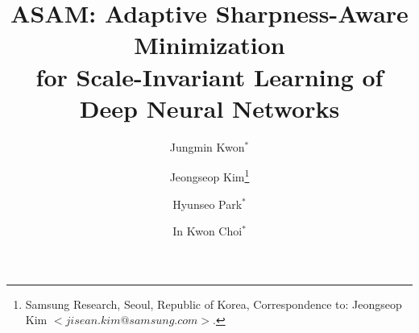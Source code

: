 \documentclass{article}
\begin{document}
\ificml
    \printAffiliationsAndNotice{}  
\else 
    \title{ASAM: Adaptive Sharpness-Aware Minimization\\ for Scale-Invariant Learning of Deep Neural Networks}
    \author{
      Jungmin Kwon$^*$
\and
      Jeongseop Kim\thanks{Samsung Research, Seoul, Republic of Korea, Correspondence to: Jeongseop Kim $<jisean.kim@samsung.com>$.} \\
      \and
      Hyunseo Park$^*$
\and
      In Kwon Choi$^*$
}
    \date{}
    \maketitle
\fi


\ificml
    \newcommand\figureratio{0.85}
    \newcommand\beginfigure{\begin{figure}[!t]}
    \newcommand\jmkendfigure{\end{figure}}
    \newcommand\begintable{\begin{table}[!h]}
    \newcommand\jmkendtable{\end{table}}
\else
    \newcommand\figureratio{0.75}
    \newcommand\beginfigure{\begin{figure}}
    \newcommand\jmkendfigure{\end{figure}}
    \newcommand\begintable{\begin{table}}
    \newcommand\jmkendtable{\end{table}}
\fi 
\end{document}
